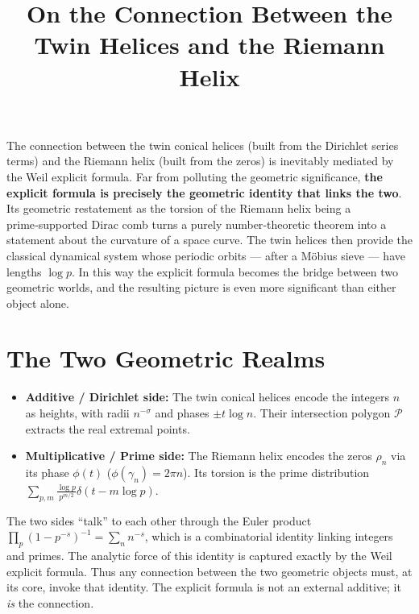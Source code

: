 \documentclass[12pt,a4paper]{article}
\title{\bf On the Connection Between the Twin Helices and the Riemann Helix}
\author{}
\date{}
\begin{document}
\maketitle

The connection between the twin conical helices (built from the Dirichlet series terms) and the Riemann helix (built from the zeros) is inevitably mediated by the Weil explicit formula.  Far from polluting the geometric significance, \textbf{the explicit formula is precisely the geometric identity that links the two}.  Its geometric restatement as the torsion of the Riemann helix being a prime‑supported Dirac comb turns a purely number‑theoretic theorem into a statement about the curvature of a space curve.  The twin helices then provide the classical dynamical system whose periodic orbits — after a M\"obius sieve — have lengths $\log p$.  In this way the explicit formula becomes the bridge between two geometric worlds, and the resulting picture is even more significant than either object alone.

\section{The Two Geometric Realms}
\begin{itemize}
\item \textbf{Additive / Dirichlet side:} The twin conical helices encode the integers $n$ as heights, with radii $n^{-\sigma}$ and phases $\pm t\log n$.  Their intersection polygon $\mathcal{P}$ extracts the real extremal points.
\item \textbf{Multiplicative / Prime side:} The Riemann helix encodes the zeros $\rho_n$ via its phase $\phi(t)$ ($\phi(\gamma_n)=2\pi n$).  Its torsion is the prime distribution $\sum_{p,m}\frac{\log p}{p^{m/2}}\delta(t-m\log p)$.
\end{itemize}
The two sides ``talk'' to each other through the Euler product $\prod_{p}(1-p^{-s})^{-1} = \sum_n n^{-s}$, which is a combinatorial identity linking integers and primes.  The analytic force of this identity is captured exactly by the Weil explicit formula.  Thus any connection between the two geometric objects must, at its core, invoke that identity.  The explicit formula is not an external additive; it \emph{is} the connection.
\end{document}

